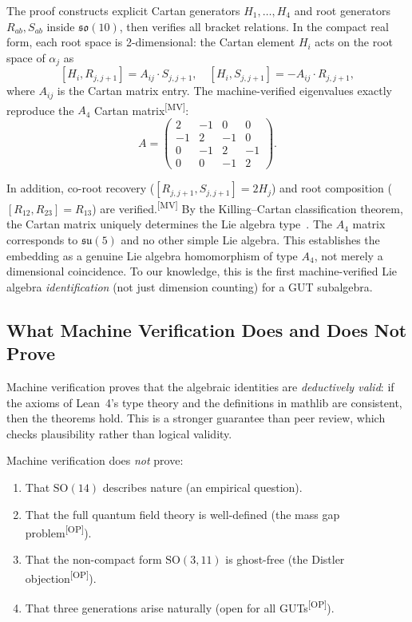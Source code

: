 \documentclass[aps,prd,twocolumn,showpacs,preprintnumbers,superscriptaddress,floatfix]{revtex4-2}
\newcommand{\so}{\mathfrak{so}}
\newcommand{\su}{\mathfrak{su}}
\newcommand{\MV}{\textsuperscript{[MV]}}
\newcommand{\OP}{\textsuperscript{[OP]}}
\begin{document}
The proof constructs explicit Cartan generators $H_1, \ldots, H_4$
and root generators $R_{ab}, S_{ab}$ inside $\so(10)$, then
verifies all bracket relations.  In the compact real form, each root
space is 2-dimensional: the Cartan element $H_i$ acts on the root
space of $\alpha_j$ as
\begin{equation}\label{eq:cartan-action}
  [H_i, R_{j,j+1}] = A_{ij} \cdot S_{j,j+1}, \quad
  [H_i, S_{j,j+1}] = -A_{ij} \cdot R_{j,j+1},
\end{equation}
where $A_{ij}$ is the Cartan matrix entry.  The machine-verified
eigenvalues exactly reproduce the $A_4$ Cartan matrix\MV:
\begin{equation}\label{eq:A4-cartan}
  A = \begin{pmatrix}
    2 & -1 & 0 & 0 \\
    -1 & 2 & -1 & 0 \\
    0 & -1 & 2 & -1 \\
    0 & 0 & -1 & 2
  \end{pmatrix}.
\end{equation}

In addition, co-root recovery ($[R_{j,j+1}, S_{j,j+1}] = 2 H_j$)
and root composition ($[R_{12}, R_{23}] = R_{13}$) are verified.\MV{}
By the Killing--Cartan classification theorem, the Cartan matrix
uniquely determines the Lie algebra type~\cite{humphreys1972}.
The $A_4$ matrix corresponds to $\su(5)$ and no other simple Lie algebra.
This establishes the embedding as a genuine Lie algebra homomorphism
of type $A_4$, not merely a dimensional coincidence.  To our knowledge,
this is the first machine-verified Lie algebra \emph{identification}
(not just dimension counting) for a GUT subalgebra.

\subsection{What Machine Verification Does and Does Not Prove}

Machine verification proves that the algebraic identities are
\emph{deductively valid}: if the axioms of Lean~4's type theory
and the definitions in mathlib are consistent, then the theorems
hold.  This is a stronger guarantee than peer review, which checks
plausibility rather than logical validity.

Machine verification does \emph{not} prove:
\begin{enumerate}
\item That $\mathrm{SO}(14)$ describes nature (an empirical question).
\item That the full quantum field theory is well-defined (the mass gap
  problem\OP).
\item That the non-compact form $\mathrm{SO}(3,11)$ is ghost-free
  (the Distler objection\OP).
\item That three generations arise naturally (open for all GUTs\OP).
\end{enumerate}
\end{document}
